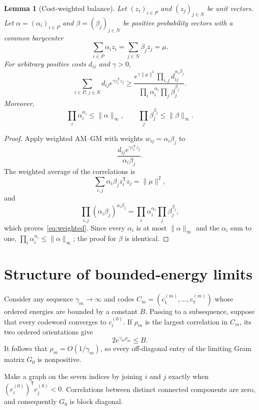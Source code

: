 \documentclass[11pt]{article}
\newtheorem{lemma}[theorem]{Lemma}
\newcommand{\norm}[1]{\lVert #1\rVert}
\begin{document}
\begin{lemma}[Cost-weighted balance]\label{lem:balance}
Let $(z_i)_{i\in P}$ and $(z_j)_{j\in N}$ be unit vectors.  Let
$\alpha=(\alpha_i)_{i\in P}$ and $\beta=(\beta_j)_{j\in N}$ be positive
probability vectors with a common barycenter
\[
 \sum_{i\in P}\alpha_i z_i
 =\sum_{j\in N}\beta_j z_j=\mu.
\]
For arbitrary positive costs $d_{ij}$ and $\gamma>0$,
\begin{equation}\label{eq:weighted}
 \sum_{i\in P,\,j\in N}d_{ij}e^{\gamma z_i^{\mathsf T}z_j}
 \ge
 \frac{e^{\gamma\norm{\mu}^2}
       \prod_{i,j}d_{ij}^{\alpha_i\beta_j}}
 {\prod_i\alpha_i^{\alpha_i}\prod_j\beta_j^{\beta_j}}.
\end{equation}
Moreover,
\begin{equation}\label{eq:maxweight}
 \prod_i\alpha_i^{\alpha_i}\le\norm{\alpha}_\infty,
 \qquad
 \prod_j\beta_j^{\beta_j}\le\norm{\beta}_\infty.
\end{equation}
\end{lemma}

\begin{proof}
Apply weighted AM--GM with weights
$w_{ij}=\alpha_i\beta_j$ to
\[
 \frac{d_{ij}e^{\gamma z_i^{\mathsf T}z_j}}
      {\alpha_i\beta_j}.
\]
The weighted average of the correlations is
\[
 \sum_{i,j}\alpha_i\beta_j z_i^{\mathsf T}z_j
 =\norm{\mu}^2,
\]
and
\[
 \prod_{i,j}(\alpha_i\beta_j)^{\alpha_i\beta_j}
 =\prod_i\alpha_i^{\alpha_i}\prod_j\beta_j^{\beta_j},
\]
which proves~\eqref{eq:weighted}.  Since every $\alpha_i$ is at most
$\norm{\alpha}_\infty$ and the $\alpha_i$ sum to one,
$\prod_i\alpha_i^{\alpha_i}\le\norm{\alpha}_\infty$; the proof for
$\beta$ is identical.
\end{proof}

\section{Structure of bounded-energy limits}

Consider any sequence $\gamma_m\to\infty$ and codes
$C_m=(c_1^{(m)},\ldots,c_7^{(m)})$ whose ordered energies are bounded by a
constant $B$.  Passing to a subsequence, suppose that every codeword converges
to $c_i^{(0)}$.  If $\rho_m$ is the largest correlation in $C_m$, its two
ordered orientations give
\[
 2e^{\gamma_m\rho_m}\le B.
\]
It follows that $\rho_m=O(1/\gamma_m)$, so every off-diagonal entry of the
limiting Gram matrix $G_0$ is nonpositive.

Make a graph on the seven indices by joining $i$ and $j$ exactly when
$(c_i^{(0)})^{\mathsf T}c_j^{(0)}<0$.  Correlations between distinct
connected components are zero, and consequently $G_0$ is block diagonal.
\end{document}
